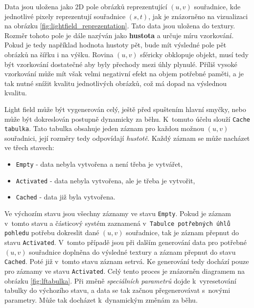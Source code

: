 Data jsou uložena jako 2D pole obrázků reprezentující \((u,v)\) souřadnice, kde jednotlivé pixely reprezentují souřadnice ${(s,t)}$, jak je znázorněno na vizualizaci na obrázku \ref{fig:lightfield_reprezentation}. Tato data jsou uložena do textury. Rozměr tohoto pole je dále nazýván jako \textbf{hustota} a určuje míru vzorkování. Pokud je tedy například hodnota hustoty pět, bude mít výsledné pole pět obrázků na šířku i na výšku. Rovina ${(u,v)}$ sféricky obklopuje objekt, musí tedy být vzorkování dostatečné aby byly přechody mezi úhly plynulé. Příliš vysoké vzorkování může mít však velmi negativní efekt na objem potřebné paměti, a je tak nutné snížit kvalitu jednotlivých obrázků, což má dopad na výslednou kvalitu. 

Light field může být vygenerován celý, ještě před spuštením hlavní smyčky, nebo může být dokreslován postupně dynamicky za běhu. K~tomuto účelu slouží \texttt{Cache tabulka}. Tato tabulka obsahuje jeden záznam pro každou možnou ${(u,v)}$ souřadnici, její rozměry tedy odpovídají \emph{hustotě}. Každý záznam se může nacházet ve třech stavech: 
\begin{itemize}
    \item \texttt{Empty} - data nebyla vytvořena a není třeba je vytvářet,
    \item \texttt{Activated} - data nebyla vytvořena, ale je třeba je vytvořit,
    \item \texttt{Cached} - data již byla vytvořena.
\end{itemize}
Ve výchozím stavu jsou všechny záznamy ve stavu \texttt{Empty}. Pokud je záznam v~tomto stavu a částicový systém zaznamená v~\texttt{Tabulce potřebných úhlů pohledu} potřebu dokreslit dané ${(u,v)}$ souřadnice, tak je záznam přepnut do stavu \texttt{Activated}. V~tomto případě jsou při dalším generování data pro potřebné ${(u,v)}$ souřadnice doplněna do výsledné textury a záznam přepnut do stavu \texttt{Cached}. Poté již v~tomto stavu záznam setrvá. Ke generování tedy dochází pouze pro záznamy ve stavu \texttt{Activated}. Celý tento proces je znázorněn diagramem na obrázku \ref{fig:lftabulka}. Při změně \emph{speciálních parametrů} dojde k~vyresetování tabulky do výchozího stavu, a data se tak začnou přegenerovávat s~novými parametry. Může tak docházet k~dynamickým změnám za běhu. 

